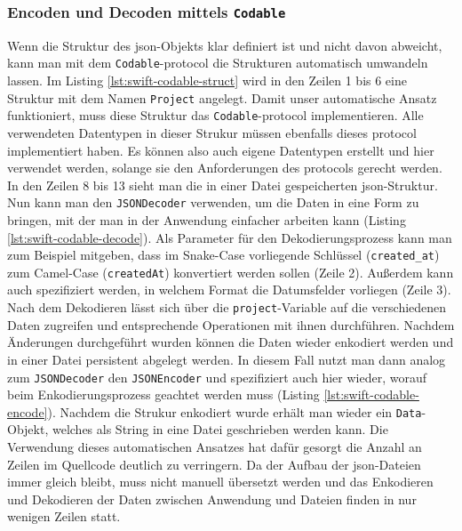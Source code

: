 \subsubsection{Encoden und Decoden mittels \texttt{Codable}}
Wenn die Struktur des \ac{json}-Objekts klar definiert ist und nicht davon abweicht, kann man mit dem \texttt{Codable}-\Gls{protocol} die Strukturen automatisch umwandeln lassen.
Im Listing \ref{lst:swift-codable-struct} wird in den Zeilen 1 bis 6 eine Struktur mit dem Namen \texttt{Project} angelegt.
Damit unser automatische Ansatz funktioniert, muss diese Struktur das \texttt{Codable}-\Gls{protocol} implementieren.
Alle verwendeten Datentypen in dieser Strukur müssen ebenfalls dieses \Gls{protocol} implementiert haben.
Es können also auch eigene Datentypen erstellt und hier verwendet werden, solange sie den Anforderungen des \Glspl{protocol} gerecht werden.
In den Zeilen 8 bis 13 sieht man die in einer Datei gespeicherten \ac{json}-Struktur.
Nun kann man den \texttt{JSONDecoder} verwenden, um die Daten in eine Form zu bringen, mit der man in der Anwendung einfacher arbeiten kann (Listing \ref{lst:swift-codable-decode}).
Als Parameter für den Dekodierungsprozess kann man zum Beispiel mitgeben, dass im Snake-Case vorliegende Schlüssel (\texttt{created\_at}) zum Camel-Case (\texttt{createdAt}) konvertiert werden sollen (Zeile 2).
Außerdem kann auch spezifiziert werden, in welchem Format die Datumsfelder vorliegen (Zeile 3).
Nach dem Dekodieren lässt sich über die \texttt{project}-Variable auf die verschiedenen Daten zugreifen und entsprechende Operationen mit ihnen durchführen.
Nachdem Änderungen durchgeführt wurden können die Daten wieder enkodiert werden und in einer Datei persistent abgelegt werden.
In diesem Fall nutzt man dann analog zum \texttt{JSONDecoder} den \texttt{JSONEncoder} und spezifiziert auch hier wieder, worauf beim Enkodierungsprozess geachtet werden muss (Listing \ref{lst:swift-codable-encode}).
Nachdem die Strukur enkodiert wurde erhält man wieder ein \texttt{Data}-Objekt, welches als String in eine Datei geschrieben werden kann.\pbreak%
%
Die Verwendung dieses automatischen Ansatzes hat dafür gesorgt die Anzahl an Zeilen im Quellcode deutlich zu verringern.
Da der Aufbau der \ac{json}-Dateien immer gleich bleibt, muss nicht manuell übersetzt werden und das Enkodieren und Dekodieren der Daten zwischen Anwendung und Dateien finden in nur wenigen Zeilen statt.

